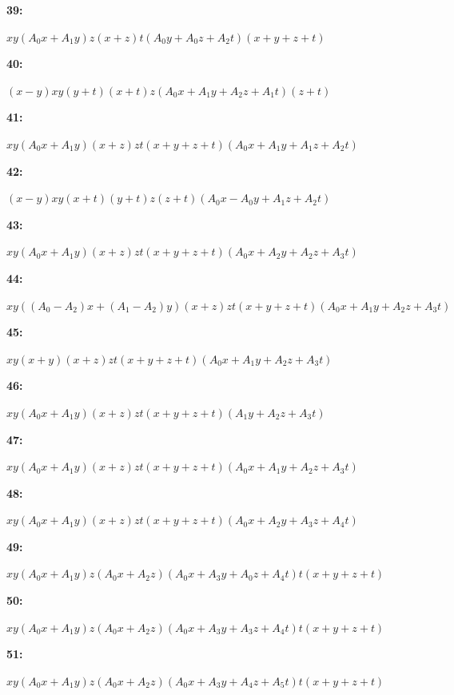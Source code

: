 \documentclass[12pt]{amsart}
\theoremstyle{plain}
\theoremstyle{remark}
\theoremstyle{definition}
\numberwithin{table}{section}
\begin{document}
\noindent\parbox[right]{9mm}{\textbf{39:}}\parbox{3mm}{\hfill}%
\parbox[t]{15cm}{\(xy(A_{0}x + A_{1}y)z(x + z)t(A_{0}y + A_{0}z + A_{2}t)(x + y + z + t)\)}

\noindent\parbox[right]{9mm}{\textbf{40:}}\parbox{3mm}{\hfill}%
\parbox[t]{15cm}{\((x - y)xy(y + t)(x + t)z(A_{0}x + A_{1}y + A_{2}z + A_{1}t)(z + t)\)}

\noindent\parbox[right]{9mm}{\textbf{41:}}\parbox{3mm}{\hfill}%
\parbox[t]{15cm}{\(xy(A_{0}x + A_{1}y)(x + z)zt(x + y + z + t)(A_{0}x + A_{1}y + A_{1}z + A_{2}t)\)}

\noindent\parbox[right]{9mm}{\textbf{42:}}\parbox{3mm}{\hfill}%
\parbox[t]{15cm}{\((x - y)xy(x + t)(y + t)z(z + t)(A_{0}x - A_{0}y + A_{1}z + A_{2}t)\)}

\noindent\parbox[right]{9mm}{\textbf{43:}}\parbox{3mm}{\hfill}%
\parbox[t]{15cm}{\(xy(A_{0}x + A_{1}y)(x + z)zt(x + y + z + t)(A_{0}x + A_{2}y + A_{2}z + A_{3}t)\)}

\noindent\parbox[right]{9mm}{\textbf{44:}}\parbox{3mm}{\hfill}%
\parbox[t]{15cm}{\(xy((A_{0} - A_{2})x + (A_{1} - A_{2})y)(x + z)zt(x + y + z + t)(A_{0}x + A_{1}y + A_{2}z + A_{3}t)\)}

\noindent\parbox[right]{9mm}{\textbf{45:}}\parbox{3mm}{\hfill}%
\parbox[t]{15cm}{\(xy(x + y)(x + z)zt(x + y + z + t)(A_{0}x + A_{1}y + A_{2}z + A_{3}t)\)}

\noindent\parbox[right]{9mm}{\textbf{46:}}\parbox{3mm}{\hfill}%
\parbox[t]{15cm}{\(xy(A_{0}x + A_{1}y)(x + z)zt(x + y + z + t)(A_{1}y + A_{2}z + A_{3}t)\)}

\noindent\parbox[right]{9mm}{\textbf{47:}}\parbox{3mm}{\hfill}%
\parbox[t]{15cm}{\(xy(A_{0}x + A_{1}y)(x + z)zt(x + y + z + t)(A_{0}x + A_{1}y + A_{2}z + A_{3}t)\)}

\noindent\parbox[right]{9mm}{\textbf{48:}}\parbox{3mm}{\hfill}%
\parbox[t]{15cm}{\(xy(A_{0}x + A_{1}y)(x + z)zt(x + y + z + t)(A_{0}x + A_{2}y + A_{3}z + A_{4}t)\)}

\noindent\parbox[right]{9mm}{\textbf{49:}}\parbox{3mm}{\hfill}%
\parbox[t]{15cm}{\(xy(A_{0}x + A_{1}y)z(A_{0}x + A_{2}z)(A_{0}x + A_{3}y + A_{0}z + A_{4}t)t(x + y + z + t)\)}

\noindent\parbox[right]{9mm}{\textbf{50:}}\parbox{3mm}{\hfill}%
\parbox[t]{15cm}{\(xy(A_{0}x + A_{1}y)z(A_{0}x + A_{2}z)(A_{0}x + A_{3}y + A_{3}z + A_{4}t)t(x + y + z + t)\)}

\noindent\parbox[right]{9mm}{\textbf{51:}}\parbox{3mm}{\hfill}%
\parbox[t]{15cm}{\(xy(A_{0}x + A_{1}y)z(A_{0}x + A_{2}z)(A_{0}x + A_{3}y + A_{4}z + A_{5}t)t(x + y + z + t)\)}
\end{document}
